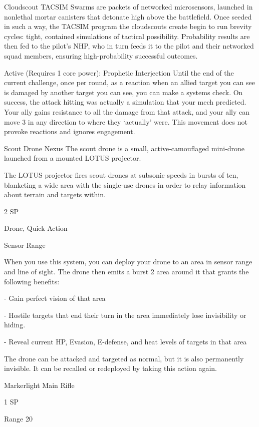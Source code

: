   Cloudscout TACSIM Swarms are packets of networked microsensors, launched in nonlethal mortar
  canisters that detonate high above the battlefield. Once seeded in such a way, the TACSIM program the
  cloudscouts create begin to run brevity cycles: tight, contained simulations of tactical possibility.
  Probability results are then fed to the pilot’s NHP, who in turn feeds it to the pilot and their networked
  squad members, ensuring high-probability successful outcomes.

  Active (Requires 1 core power): Prophetic Interjection
  Until the end of the current challenge, once per round, as a reaction when an allied target you can see
  is damaged by another target you can see, you can make a systems check. On success, the attack
  hitting was actually a simulation that your mech predicted. Your ally gains resistance to all the damage
  from that attack, and your ally can move 3 in any direction to where they ‘actually’ were. This
  movement does not provoke reactions and ignores engagement.

Scout Drone Nexus
The scout drone is a small, active-camouflaged mini-drone launched from a mounted LOTUS projector.

The LOTUS projector fires scout drones at subsonic speeds in bursts of ten, blanketing a wide area with
the single-use drones in order to relay information about terrain and targets within.

2 SP

Drone, Quick Action





Sensor Range

When you use this system, you can deploy your drone to an area in sensor range and line of
sight. The drone then emits a burst 2 area around it that grants the following benefits:

  - Gain perfect vision of that area

  - Hostile targets that end their turn in the area immediately lose invisibility or hiding.

  - Reveal current HP, Evasion, E-defense, and heat levels of targets in that area

The drone can be attacked and targeted as normal, but it is also permanently invisible. It can be
recalled or redeployed by taking this action again.


Markerlight
Main Rifle

1 SP

Range 20


